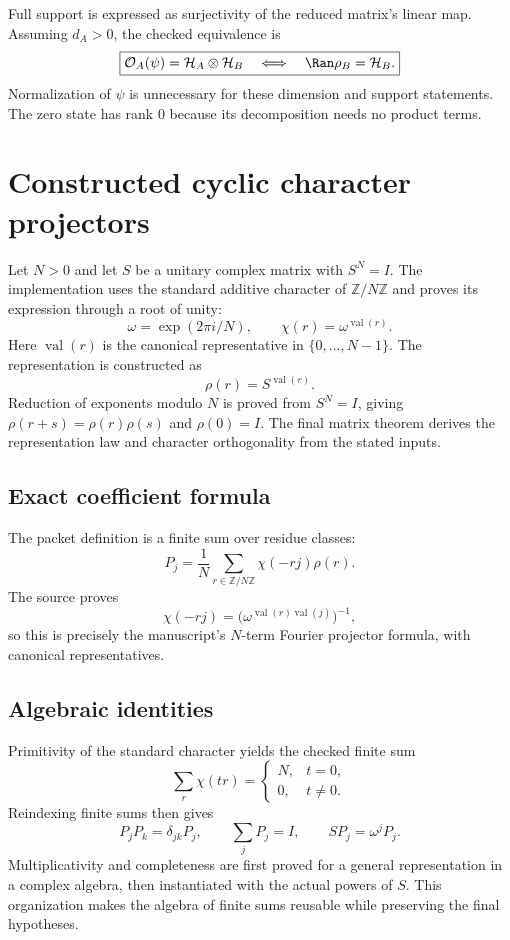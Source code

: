 Full support is expressed as surjectivity of the reduced matrix's linear map. Assuming $d_A>0$, the checked equivalence is
\[
\boxed{\mathcal O_A(\psi)=\mathcal H_A\otimes\mathcal H_B
\quad\Longleftrightarrow\quad \Ran\rho_B=\mathcal H_B.}
\]
Normalization of $\psi$ is unnecessary for these dimension and support statements. The zero state has rank $0$ because its decomposition needs no product terms.





\section{Constructed cyclic character projectors}\label{supp3:section:003}
Let $N>0$ and let $S$ be a unitary complex matrix with $S^N=I$. The implementation uses the standard additive character of $\mathbb Z/N\mathbb Z$ and proves its expression through a root of unity:
\[
\omega=\exp(2\pi i/N),\qquad
\chi(r)=\omega^{\operatorname{val}(r)}.
\]
Here $\operatorname{val}(r)$ is the canonical representative in $\{0,\ldots,N-1\}$. The representation is constructed as
\[
\rho(r)=S^{\operatorname{val}(r)}.
\]
Reduction of exponents modulo $N$ is proved from $S^N=I$, giving $\rho(r+s)=\rho(r)\rho(s)$ and $\rho(0)=I$. The final matrix theorem derives the representation law and character orthogonality from the stated inputs.

\subsection{Exact coefficient formula}
The packet definition is a finite sum over residue classes:
\[
P_j=\frac1N\sum_{r\in\mathbb Z/N\mathbb Z}\chi(-rj)\rho(r).
\]
The source proves
\[
\chi(-rj)=\bigl(\omega^{\operatorname{val}(r)\operatorname{val}(j)}\bigr)^{-1},
\]
so this is precisely the manuscript's $N$-term Fourier projector formula, with canonical representatives.

\subsection{Algebraic identities}
Primitivity of the standard character yields the checked finite sum
\[
\sum_r\chi(tr)=\begin{cases}N,&t=0,\\0,&t\ne0.\end{cases}
\]
Reindexing finite sums then gives
\[
\boxed{P_jP_k=\delta_{jk}P_j,\qquad \sum_jP_j=I,\qquad SP_j=\omega^jP_j.}
\]
Multiplicativity and completeness are first proved for a general representation in a complex algebra, then instantiated with the actual powers of $S$. This organization makes the algebra of finite sums reusable while preserving the final hypotheses.

